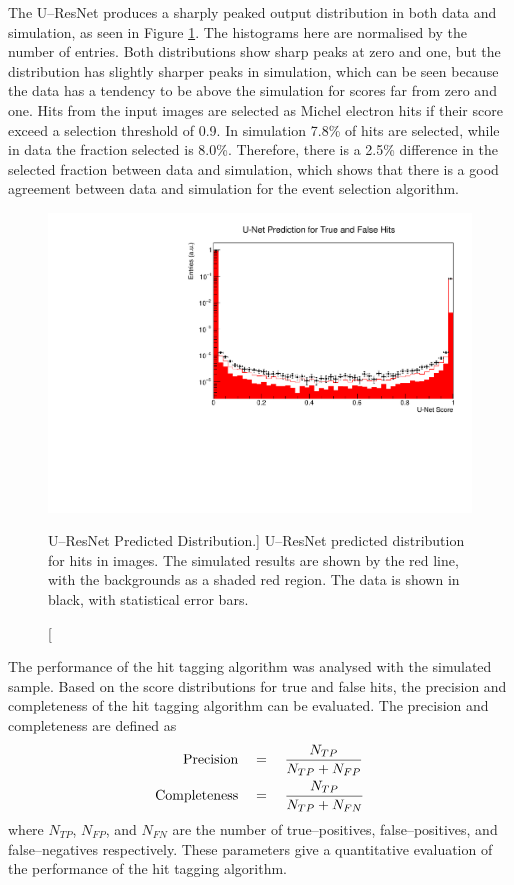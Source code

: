 The U--ResNet produces a sharply peaked output distribution in both data and
simulation, as seen in Figure \ref{fig:unet_pred_data}. The histograms here are
normalised by the number of entries. Both distributions show sharp peaks at zero
and one, but the distribution has slightly sharper peaks in simulation, which 
can be seen because the data has a tendency to be above the simulation for
scores far from zero and one. Hits from the input images are selected as 
Michel electron hits if their score exceed a selection threshold of 0.9. In 
simulation 7.8\% of hits are selected, while in data the fraction selected is 
8.0\%. Therefore, there is a 2.5\% difference in the selected fraction between 
data and simulation, which shows that there is a good agreement between data and
simulation for the event selection algorithm.
\begin{figure}
	\centering
	\includegraphics[width=\textwidth]{figures/unet_pred_data.pdf}
	\caption
	[U--ResNet Predicted Distribution.]
	{U--ResNet predicted distribution for hits in images. The simulated results are
	shown by the red line, with the backgrounds as a shaded red region. The data 
	is shown in black, with statistical error bars.}
	\label{fig:unet_pred_data}
\end{figure}

The performance of the hit tagging algorithm was analysed with the simulated
sample. Based on the score distributions for true and false hits, the precision 
and completeness of the hit tagging algorithm can be evaluated. The precision 
and completeness are defined as 
\begin{align*}
	\mbox{Precision} \quad &= \quad  \frac{N_{TP}}{N_{TP} + N_{FP}} \\
	\vspace{2mm}
	\mbox{Completeness} \quad &= \quad \frac{N_{TP}}{N_{TP} + N_{FN}}
\end{align*}
where $N_{TP}$, $N_{FP}$, and $N_{FN}$ are the number of true--positives,
false--positives, and false--negatives respectively. These parameters give a
quantitative evaluation of the performance of the hit tagging algorithm.

